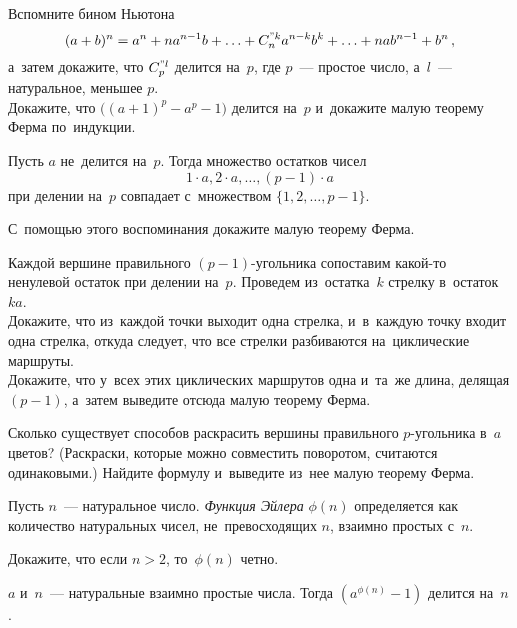 \begin{problems}

\item
\subproblem
Вспомните бином Ньютона
\[
    (a + b)^n
=
    a^n + n a^{n-1} b +
    \ldots +
    C_{n}^{"k} a^{n-k} b^k +
    \ldots +
    n a b^{n-1} + b^n
\,,\] а~затем докажите, что $C_{p}^{"l}$ делится на~$p$, где $p$~--- простое число,
а~$l$~--- натуральное, меньшее $p$.
\\
\subproblem
Докажите, что $\bigl( (a + 1)^p - a^p - 1 \bigr)$ делится на~$p$ и~докажите
малую теорему Ферма по~индукции.

\item
\label{algebra/number-theory/fermats-theorem-g8r1:problem:fermat-proof-1}%
Пусть $a$ не~делится на~$p$.
Тогда множество остатков чисел
\[
    1 \cdot a, 2 \cdot a, \ldots, (p - 1) \cdot a
\]
при делении на~$p$ совпадает с~множеством $\{ 1, 2, \ldots, p - 1 \}$.
\par
С~помощью этого воспоминания докажите малую теорему Ферма.

\item
\label{algebra/number-theory/fermats-theorem-g8r1:problem:fermat-proof-2}%
Каждой вершине правильного $(p - 1)$-угольника сопоставим какой-то ненулевой
остаток при делении на~$p$.
Проведем из~остатка~$k$ стрелку в~остаток~$k a$.
\\
\subproblem
Докажите, что из~каждой точки выходит одна стрелка, и~в~каждую точку входит
одна стрелка, откуда следует, что все стрелки разбиваются на~циклические
маршруты.
\\
\subproblem
Докажите, что у~всех этих циклических маршрутов одна и~та~же длина, делящая
$(p - 1)$, а~затем выведите отсюда малую теорему Ферма.

\item
Сколько существует способов раскрасить вершины правильного $p$-угольника
в~$a$ цветов?
(Раскраски, которые можно совместить поворотом, считаются одинаковыми.)
Найдите формулу и~выведите из~нее малую теорему Ферма.

\end{problems}

Пусть $n$~--- натуральное число.
\emph{Функция Эйлера} $\phi(n)$ определяется как количество натуральных чисел,
не~превосходящих $n$, взаимно простых с~$n$.

Докажите, что если $n > 2$, то~$\phi(n)$ четно.

$a$ и~$n$~--- натуральные взаимно простые числа.
Тогда $(a^{\phi(n)} - 1)$ делится на~$n$.

